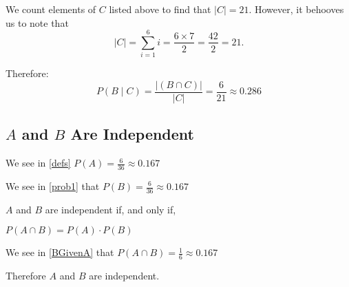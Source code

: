 \documentclass[a4paper,11pt]{article}
\begin{document}
We count elements of $C$ listed above to find that $\left| C \right|
= 21$.  However, it behooves us to note that 
\begin{equation}
  \left| C \right| = \sum_{i=1}^{6} i = \frac{6 \times 7} {2} = 
    \frac{42}{2} = 21.
\end{equation}

Therefore:
\begin{equation}
  P\left( B \mid C \right) = 
  \frac{\left| \left( B \cap C \right) \right|} {\left| C \right|}
  = \frac{6}{21} \approx 0.286
\end{equation}

\subsection{$A$ and $B$ Are Independent}
We see in  \ref{defs} $P \left( A \right) = \frac{6}{36} \approx 0.167$

We see in \ref{prob1} that $P \left(B \right) = \frac{6}{36} \approx 0.167$

$A$ and $B$ are independent if, and only if, 

$P\left( A \cap B \right) = P\left( A \right) \cdot P\left(B \right)$

We see in \ref{BGivenA} that $P\left(A \cap B \right)=\frac{1}{6} \approx 0.167$

Therefore $A$ and $B$ are independent. \blacksquare

\printbibliography{}
\end{document}
